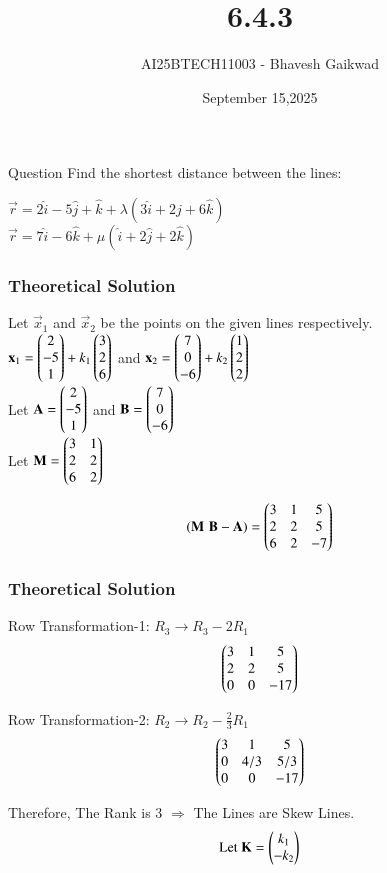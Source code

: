 \documentclass{beamer}
\title
{6.4.3}
\date{September 15,2025}
\author 
{AI25BTECH11003 - Bhavesh Gaikwad}
\begin{document}
\frame{\titlepage}
\begin{frame}{Question}
Find the shortest distance between the lines:\\
\begin{center}
$\vec{r} = 2\hat{i} - 5\hat{j} +\hat{k} + \lambda(3\hat{i} + 2\hat{j} + 6\hat{k})$\\
$\vec{r} = 7\hat{i} - 6\hat{k} + \mu(\hat{i} + 2\hat{j} + 2\hat{k})$
\end{center}
\end{frame}

\begin{frame}[fragile]
    \frametitle{Theoretical Solution}
Let $\vec{x}_1$ and $\vec{x}_2$ be the points on the given lines respectively.\\
$\mathbf{x}_1 = \begin{pmatrix}2 \\ -5 \\ 1\end{pmatrix} + k_1\begin{pmatrix}3 \\ 2 \\6\end{pmatrix}$ and $\mathbf{x}_2 = \begin{pmatrix}7 \\ 0 \\ -6\end{pmatrix} + k_2\begin{pmatrix}1 \\ 2 \\2\end{pmatrix}$\\
Let $\mathbf{A} = \begin{pmatrix}2 \\ -5 \\ 1\end{pmatrix}$ and $\mathbf{B} = \begin{pmatrix}7 \\ 0 \\ -6\end{pmatrix}$\\
Let $\mathbf{M} = \begin{pmatrix}3 & 1 \\ 2 & 2 \\ 6 & 2\end{pmatrix}$


\begin{equation}
    (\mathbf{M} \, \, \mathbf{B}-\mathbf{A}) = \begin{pmatrix}3 & 1 & 5 \\ 2 & 2 & 5 \\ 6 & 2 & -7\end{pmatrix}
\end{equation}
\end{frame}

\begin{frame}[fragile]
\frametitle{Theoretical Solution}
Row Transformation-1: $R_3 \rightarrow R_3 - 2R_1$
\begin{equation}
\begin{pmatrix}3 & 1 & 5 \\ 2 & 2 & 5 \\ 0 & 0 & -17\end{pmatrix}
\end{equation}

Row Transformation-2: $R_2 \rightarrow R_2 - \frac{2}{3}R_1$
\begin{equation}
    \begin{pmatrix}3 & 1 & 5 \\ 0 & 4/3 & 5/3 \\ 0 & 0 & -17\end{pmatrix}
\end{equation}

Therefore, The Rank is 3 $\Rightarrow$ The Lines are Skew Lines.\\

\begin{equation}
\text{Let } \mathbf{K} = \begin{pmatrix}k_1 \\ -k_2\end{pmatrix}   
\end{equation}
\end{frame}
\end{document}
